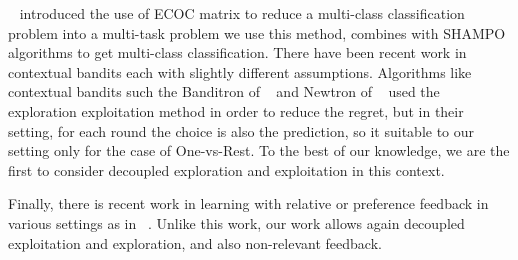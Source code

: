 
~\cite{dietterich1995solving} introduced the use of ECOC matrix to reduce a 
multi-class classification problem into a multi-task problem we use this method, combines with 
SHAMPO algorithms to get multi-class classification. There have been recent work in contextual bandits 
each with slightly different assumptions. Algorithms like contextual bandits such the Banditron of 
~\cite{kakade2008efficient} and Newtron of ~\cite{hazan2011newtron}  used the 
exploration exploitation method in order to reduce the regret, but in their setting, for each round the choice 
is also the prediction, so it suitable to our setting only for the case of One-vs-Rest.
To the best of our knowledge, we are the first to consider decoupled exploration and exploitation in this 
context. 

Finally, there is recent work in learning with relative or preference feedback in various 
settings as in ~\cite{DBLP:conf/colt/YueBKJ09,DBLP:journals/jcss/YueBKJ12,DBLP:conf/icml/YueJ11,DBLP:journals/corr/abs-1111-0712}. 
Unlike this work, our work allows again decoupled exploitation and exploration, and also 
non-relevant feedback.



